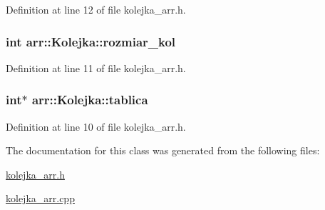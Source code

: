 Definition at line 12 of file kolejka\-\_\-arr.\-h.

\hypertarget{classarr_1_1_kolejka_adbfdaca50c2b0bbe75d9b1e572f9b320}{
\subsubsection[{rozmiar\-\_\-kol}]{\setlength{\rightskip}{0pt plus 5cm}int arr\-::\-Kolejka\-::rozmiar\-\_\-kol\hspace{0.3cm}{\ttfamily [private]}}}\label{classarr_1_1_kolejka_adbfdaca50c2b0bbe75d9b1e572f9b320}


Definition at line 11 of file kolejka\-\_\-arr.\-h.

\hypertarget{classarr_1_1_kolejka_a80a504c56893e43ae1b407b971b501a7}{
\subsubsection[{tablica}]{\setlength{\rightskip}{0pt plus 5cm}int$\ast$ arr\-::\-Kolejka\-::tablica\hspace{0.3cm}{\ttfamily [private]}}}\label{classarr_1_1_kolejka_a80a504c56893e43ae1b407b971b501a7}


Definition at line 10 of file kolejka\-\_\-arr.\-h.



The documentation for this class was generated from the following files\-:\begin{DoxyCompactItemize}
\item 
\hyperlink{kolejka__arr_8h}{kolejka\-\_\-arr.\-h}\item 
\hyperlink{kolejka__arr_8cpp}{kolejka\-\_\-arr.\-cpp}\end{DoxyCompactItemize}
